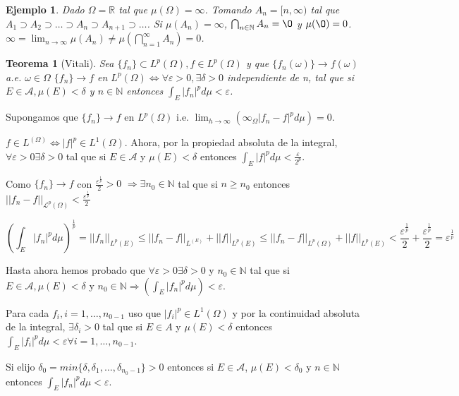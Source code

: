 \documentclass[11pt, a4paper]{article}
\makeatletter
\newif\IfInSansMode
\let\oldsf\sffamily
\renewcommand*{\sffamily}{\oldsf\mathversion{sans}\InSansModetrue}
\let\oldnorm\normalfont
\renewcommand*{\normalfont}{\oldnorm\InSansModefalse\mathversion{normal}}
\newcommand{\R}{\mathbb{R}} \newcommand{\N}{\mathbb{N}}
\renewenvironment{proof}[1][\proofname] {\par\pushQED{\qed}\normalfont\topsep6\p@\@plus6\p@\relax\trivlist\item[\hskip\labelsep\itshape\sffamily#1\@addpunct{.}]\ignorespaces}{\popQED\endtrivlist\@endpefalse}
\theoremstyle{theorem-style}
\newtheorem{nth}{Teorema}[section]
\theoremstyle{definition-style}
\theoremstyle{remark-style}
\theoremstyle{example-style}
\newtheorem{ejemplo}{Ejemplo}[section]
\makeatother
\begin{document}

\begin{ejemplo}
  Dado $\Omega = \R$ tal que $\mu(\Omega) = \infty$. Tomando $A_n = [n,
  \infty)$ tal que $A_1 \supset A_2 \supset \hdots \supset A_n \supset
  A_{n+1} \supset \hdots$. Si $\mu(A_n) = \infty$, $\bigcap_{n\in \N} A_n =
  \O$ y $\mu(\O) = 0$. $\infty = \lim_{n \to \infty} \mu(A_n) \neq
  \mu(\bigcap_{n=1}^{\infty} A_n) = 0$.
\end{ejemplo}

\begin{nth}[Vitali]
  Sea $\{f_n\} \subset L^p(\Omega), f \in L^p(\Omega)$ y que
  $\{f_n(\omega)\} \rightarrow f(\omega)$ a.e. $\omega \in \Omega$ $\{f_n\}
  \rightarrow f$ en $L^p(\Omega) \Leftrightarrow \forall \varepsilon > 0,
  \exists \delta > 0$ independiente de n, tal que si $E \in \mathscr A, \mu(E) <
  \delta$ y $n \in \N$ entonces $\int_E |f_n|^pd\mu < \varepsilon$.
\end{nth}

\begin{proof}
   \boxed{\Rightarrow} Supongamos que $\{f_n\} \rightarrow f$ en $L^p(\Omega)$
   i.e. $\lim_{h \to \infty}(\infty_{\Omega}|f_n - f|^pd\mu) = 0$.

   $f \in L^(\Omega) \Leftrightarrow |f|^p \in L^1(\Omega)$. Ahora, por la
   propiedad absoluta de la integral, $\forall \varepsilon > 0 \exists \delta >
   0$ tal que si $E \in \mathscr A$ y $\mu(E) < \delta$ entonces $\displaystyle \int_E |f|^p d\mu < \frac{\varepsilon}{2^p}$.

   Como $\{f_n\} \rightarrow f$ con  $\frac{\varepsilon^{\frac{1}{p}}}{2} > 0$ $\Rightarrow \exists n_0 \in \N$ tal que si $n
   \geq n_0$ entonces $||f_n - f||_{\mathcal L^p(\Omega)} < \frac{\varepsilon^{\frac{1}{p}}}{2}$ 

   $$\left(\int_E |f_n|^p d\mu\right)^{\frac{1}{p}} = ||f_n||_{ L^p(E)} \leq ||f_n -
   f||_{ L^(E)}+ ||f||_{ L^p(E)} \leq ||f_n - f||_{
     L^p(\Omega)} + ||f||_{ L^p(E)} <
   \frac{\varepsilon^{\frac{1}{p}}}{2} + \frac{\varepsilon^{\frac{1}{p}}}{2} =
   \varepsilon^{\frac{1}{p}}$$

   Hasta ahora hemos probado que $\forall \varepsilon > 0 \exists \delta > 0$ y
   $n_0 \in \N$ tal que si $E \in \mathscr A, \mu(E) <
  \delta$ y $n_0 \in \N \Rightarrow \left( \int_E|f_n|^p d\mu \right) <
  \varepsilon$.

  Para cada $f_i, i=1, \hdots, n_{0-1}$ uso que $|f_i|^p \in L^1(\Omega)$ y por
  la continuidad absoluta de la integral, $\exists \delta_i > 0$ tal que si $E
  \in A$ y $\mu(E) < \delta$ entonces $\int_E |f_i|^p d\mu < \varepsilon \forall
  i = 1, \hdots , n_{0-1}$.

  Si elijo $\delta_0 = min\{\delta, \delta_1, \hdots, \delta_{n_0 -1}\} > 0$
  entonces si $E \in \mathscr A$, $\mu(E) < \delta_0$ y $n \in \N$ entonces
  $\int_E |f_n|^p d \mu < \varepsilon$.

  \boxed{\Leftarrow}

  
\end{proof}
\end{document}
